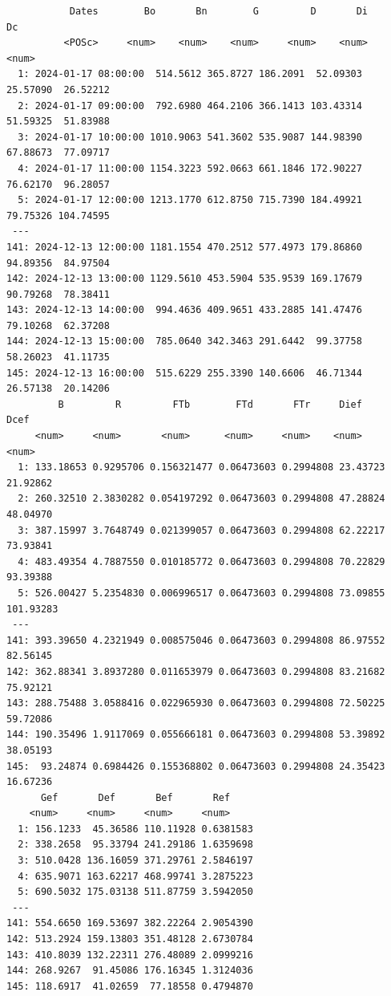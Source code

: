 \begin{itemize}
\begin{verbatim}
		   Dates        Bo       Bn        G         D       Di        Dc
		  <POSc>     <num>    <num>    <num>     <num>    <num>     <num>
  1: 2024-01-17 08:00:00  514.5612 365.8727 186.2091  52.09303 25.57090  26.52212
  2: 2024-01-17 09:00:00  792.6980 464.2106 366.1413 103.43314 51.59325  51.83988
  3: 2024-01-17 10:00:00 1010.9063 541.3602 535.9087 144.98390 67.88673  77.09717
  4: 2024-01-17 11:00:00 1154.3223 592.0663 661.1846 172.90227 76.62170  96.28057
  5: 2024-01-17 12:00:00 1213.1770 612.8750 715.7390 184.49921 79.75326 104.74595
 ---                                                                             
141: 2024-12-13 12:00:00 1181.1554 470.2512 577.4973 179.86860 94.89356  84.97504
142: 2024-12-13 13:00:00 1129.5610 453.5904 535.9539 169.17679 90.79268  78.38411
143: 2024-12-13 14:00:00  994.4636 409.9651 433.2885 141.47476 79.10268  62.37208
144: 2024-12-13 15:00:00  785.0640 342.3463 291.6442  99.37758 58.26023  41.11735
145: 2024-12-13 16:00:00  515.6229 255.3390 140.6606  46.71344 26.57138  20.14206
	     B         R         FTb        FTd       FTr     Dief      Dcef
	 <num>     <num>       <num>      <num>     <num>    <num>     <num>
  1: 133.18653 0.9295706 0.156321477 0.06473603 0.2994808 23.43723  21.92862
  2: 260.32510 2.3830282 0.054197292 0.06473603 0.2994808 47.28824  48.04970
  3: 387.15997 3.7648749 0.021399057 0.06473603 0.2994808 62.22217  73.93841
  4: 483.49354 4.7887550 0.010185772 0.06473603 0.2994808 70.22829  93.39388
  5: 526.00427 5.2354830 0.006996517 0.06473603 0.2994808 73.09855 101.93283
 ---                                                                        
141: 393.39650 4.2321949 0.008575046 0.06473603 0.2994808 86.97552  82.56145
142: 362.88341 3.8937280 0.011653979 0.06473603 0.2994808 83.21682  75.92121
143: 288.75488 3.0588416 0.022965930 0.06473603 0.2994808 72.50225  59.72086
144: 190.35496 1.9117069 0.055666181 0.06473603 0.2994808 53.39892  38.05193
145:  93.24874 0.6984426 0.155368802 0.06473603 0.2994808 24.35423  16.67236
	  Gef       Def       Bef       Ref
	<num>     <num>     <num>     <num>
  1: 156.1233  45.36586 110.11928 0.6381583
  2: 338.2658  95.33794 241.29186 1.6359698
  3: 510.0428 136.16059 371.29761 2.5846197
  4: 635.9071 163.62217 468.99741 3.2875223
  5: 690.5032 175.03138 511.87759 3.5942050
 ---                                       
141: 554.6650 169.53697 382.22264 2.9054390
142: 513.2924 159.13803 351.48128 2.6730784
143: 410.8039 132.22311 276.48089 2.0999216
144: 268.9267  91.45086 176.16345 1.3124036
145: 118.6917  41.02659  77.18558 0.4794870
\end{verbatim}


\end{itemize}
